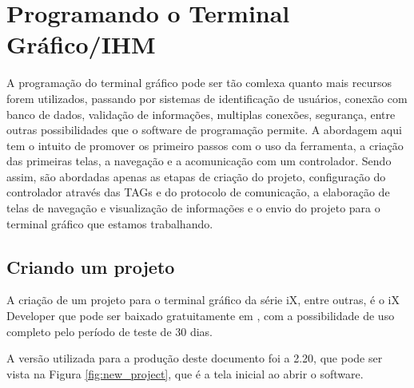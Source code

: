 \chapter{Programando o Terminal Gráfico/IHM}
\label{chap:resultados}


A programação do terminal gráfico pode ser tão comlexa quanto mais recursos forem utilizados, 
passando por sistemas de identificação de usuários, 
conexão com banco de dados, 
validação de informações, 
multiplas conexões, 
segurança, 
entre outras possibilidades que o software de programação permite. 
A abordagem aqui tem o intuito de promover os primeiro passos com o uso da ferramenta, 
a criação das primeiras telas, 
a navegação e a acomunicação com um controlador. 
Sendo assim, são abordadas apenas as etapas de criação do projeto,
configuração do controlador através das TAGs e 
do protocolo de comunicação, 
a elaboração de telas de navegação e visualização de informações e
o envio do projeto para o terminal gráfico que estamos trabalhando.


\section{Criando um projeto}

A criação de um projeto para o terminal gráfico da série iX, 
entre outras, 
é o iX Developer que pode ser baixado gratuitamente em 
\cite{terminais_operacao_serie_ix}, 
com a possibilidade de uso completo pelo período de teste de 30 dias.

A versão utilizada para a produção deste documento foi a 2.20, 
que pode ser vista na Figura \ref{fig:new_project}, 
que é a tela inicial ao abrir o software. 


\begin{figure}[ht!]
	\centering
\end{figure}

